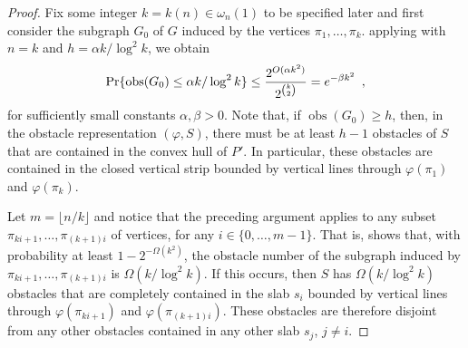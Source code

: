 \documentclass{patmorin}
\DeclareMathOperator{\obs}{obs}
\begin{document}
\begin{proof}
  Fix some integer $k=k(n)\in\omega_n(1)$ to be specified later and first
  consider the subgraph $G_0$ of $G$ induced by the vertices $\pi_1,\ldots,\pi_k$.
  applying  with $n=k$ and $h=\alpha k/\log^2 k$,
  we obtain
  \begin{equation}
       \Pr\{\obs(G_0) \le \alpha k/\log^2 k\} 
         \le \frac{2^{O(\alpha k^2)}}{2^{\binom{k}{2}}}
         = e^{-\beta k^2} \enspace , \eqlabel{g1}
  \end{equation}
  for sufficiently small constants $\alpha,\beta > 0$.  Note that, if
  $\obs(G_0)\ge h$, then, in the obstacle representation $(\varphi,S)$,
  there must be at least $h-1$ obstacles of $S$ that are contained in the
  convex hull of $P'$. In particular, these obstacles are contained in the
  closed vertical strip bounded by vertical lines through $\varphi(\pi_1)$
  and $\varphi(\pi_k)$.
  
  Let $m=\lfloor n/k\rfloor$ and notice that the preceding argument
  applies to any subset $\pi_{ki+1},\ldots,\pi_{(k+1)i}$ of vertices,
  for any $i\in\{0,\ldots,m-1\}$.  That is,  shows that, with
  probability at least $1-2^{-\Omega(k^2)}$, the obstacle number of the
  subgraph induced by $\pi_{ki+1},\ldots,\pi_{(k+1)i}$ is $\Omega(k/\log^2
  k)$.  If this occurs, then $S$ has $\Omega(k/\log^2 k)$ obstacles
  that are completely contained in the slab $s_i$ bounded by vertical
  lines through $\varphi(\pi_{ki+1})$ and $\varphi(\pi_{(k+1)i})$.
  These obstacles are therefore disjoint from any other obstacles
  contained in any other slab $s_j$, $j\neq i$.
  

\end{proof}
\end{document}
